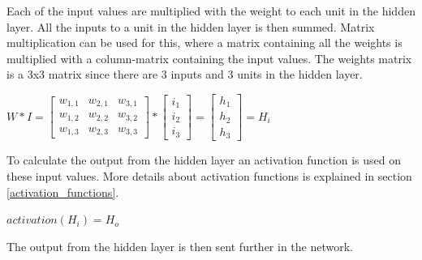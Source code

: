 Each of the input values are multiplied with the weight to each unit in the hidden layer. All the inputs to a unit in the hidden layer is then summed. Matrix multiplication can be used for this, where a matrix containing all the weights is multiplied with a column-matrix containing the input values. The weights matrix is a 3x3 matrix since there are 3 inputs and 3 units in the hidden layer.

\begin{center}
$
W * I = 
\begin{bmatrix} 
w_{1,1} & w_{2,1} & w_{3,1}\\
w_{1,2} & w_{2,2} & w_{3,2}\\
w_{1,3} & w_{2,3} & w_{3,3}
\end{bmatrix}
*
\begin{bmatrix} 
i_1\\
i_2\\
i_3
\end{bmatrix}
=
\begin{bmatrix} 
h_1\\
h_2\\
h_3
\end{bmatrix}
=
H_i
$
\end{center}

To calculate the output from the hidden layer an activation function is used on these input values. More details about activation functions is explained in section \ref{activation_functions}.

\begin{center}
$
activation(H_i) = H_o
$    
\end{center}

The output from the hidden layer is then sent further in the network.

